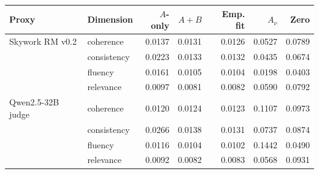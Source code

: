 \begin{tabular}{llrrrrr}
\toprule
Proxy & Dimension & $A$-only & $A{+}B$ & Emp. fit & $A_\nu$ & Zero \\
\midrule
Skywork RM v0.2 & coherence & 0.0137 & 0.0131 & 0.0126 & 0.0527 & 0.0789 \\
 & consistency & 0.0223 & 0.0133 & 0.0132 & 0.0435 & 0.0674 \\
 & fluency & 0.0161 & 0.0105 & 0.0104 & 0.0198 & 0.0403 \\
 & relevance & 0.0097 & 0.0081 & 0.0082 & 0.0590 & 0.0792 \\
\midrule
Qwen2.5-32B judge & coherence & 0.0120 & 0.0124 & 0.0123 & 0.1107 & 0.0973 \\
 & consistency & 0.0266 & 0.0138 & 0.0131 & 0.0737 & 0.0874 \\
 & fluency & 0.0116 & 0.0104 & 0.0102 & 0.1442 & 0.0490 \\
 & relevance & 0.0092 & 0.0082 & 0.0083 & 0.0568 & 0.0931 \\
\bottomrule
\end{tabular}
